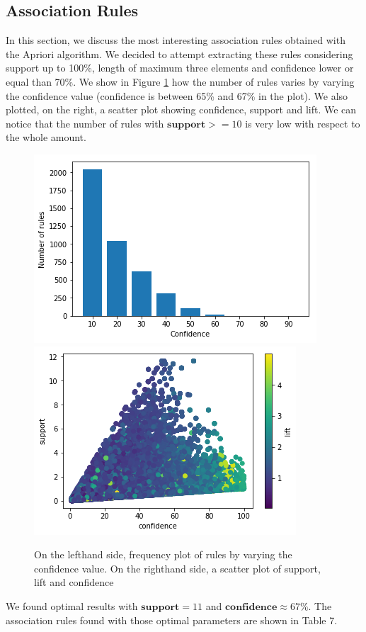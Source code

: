 \documentclass{article}
\begin{document}
	
	\subsection{Association Rules}
	In this section, we discuss the most interesting association rules obtained with the Apriori algorithm. 
	We decided to attempt extracting these rules considering support up to 100\%, length of maximum three elements and confidence lower or equal than 70\%. We show in Figure \ref{fig:hyper_rf} how the number of rules varies by varying the confidence value (confidence is between 65\% and 67\% in the plot). We also plotted, on the right, a scatter plot showing confidence, support and lift. We can notice that the number of rules with $\mathbf{support} >= 10$ is very low with respect to the whole amount.
	
	
	\begin{figure}[]
		\centering
		\includegraphics[width=.4\textwidth]{rules.png}\hspace{1cm}
		\includegraphics[width=.4\textwidth]{AbusivismoEdilizio.png}
		\caption{On the lefthand side, frequency plot of rules by varying the confidence value. On the righthand side, a scatter plot of support, lift and confidence}
		\label{fig:hyper_rf}
	\end{figure}
	
	We found optimal results with $\mathbf{support} = 11$ and $\mathbf{confidence} \approx 67\%$.  
	The association rules found with those optimal parameters are shown in Table 7.
	
\end{document}
